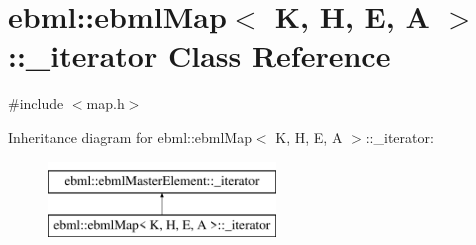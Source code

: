 \hypertarget{classebml_1_1ebmlMap_1_1__iterator}{}\section{ebml\+:\+:ebml\+Map$<$ K, H, E, A $>$\+:\+:\+\_\+iterator Class Reference}
\label{classebml_1_1ebmlMap_1_1__iterator}


{\ttfamily \#include $<$map.\+h$>$}

Inheritance diagram for ebml\+:\+:ebml\+Map$<$ K, H, E, A $>$\+:\+:\+\_\+iterator\+:\begin{figure}[H]
\begin{center}
\leavevmode
\includegraphics[height=2.000000cm]{classebml_1_1ebmlMap_1_1__iterator}
\end{center}
\end{figure}
